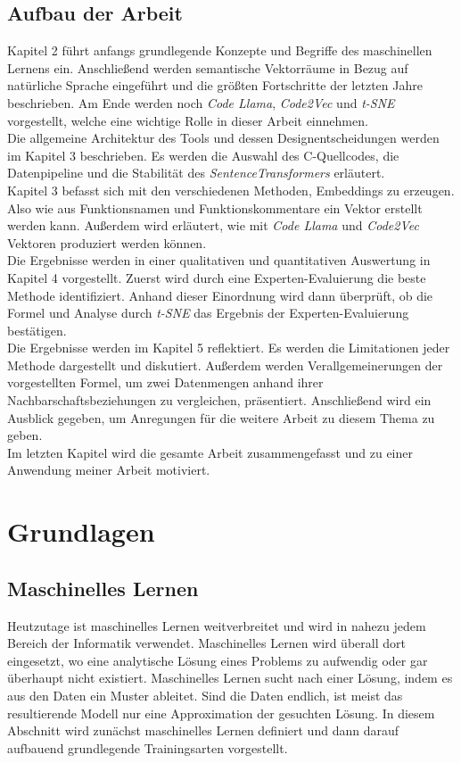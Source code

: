 \documentclass[12pt,letterpaper,ngerman]{article}
\begin{document}
\subsection{Aufbau der Arbeit}
Kapitel 2 führt anfangs grundlegende Konzepte und Begriffe des
maschinellen Lernens ein. Anschließend werden semantische 
Vektorräume in Bezug auf natürliche Sprache eingeführt und die
größten Fortschritte der letzten Jahre 
beschrieben. Am Ende werden noch \textit{Code Llama},  
\textit{Code2Vec} und \textit{t-SNE} vorgestellt, welche eine 
wichtige Rolle in dieser Arbeit einnehmen.\\
Die allgemeine Architektur des Tools und dessen Designentscheidungen werden im Kapitel 3
beschrieben. Es werden die Auswahl des C-Quellcodes, die Datenpipeline und die 
Stabilität des \textit{SentenceTransformers} erläutert.\\
Kapitel 3 befasst sich mit den verschiedenen Methoden, Embeddings
zu erzeugen. Also wie aus Funktionsnamen und Funktionskommentare 
ein Vektor erstellt werden kann. Außerdem wird erläutert, wie mit
\textit{Code Llama} und  \textit{Code2Vec} Vektoren produziert
werden können.\\
Die Ergebnisse werden in einer qualitativen und quantitativen 
Auswertung in Kapitel 4 vorgestellt. Zuerst wird durch eine 
Experten-Evaluierung die beste
Methode identifiziert. Anhand dieser Einordnung wird dann 
überprüft, ob die Formel und Analyse durch \textit{t-SNE} 
das Ergebnis der Experten-Evaluierung bestätigen.\\
Die Ergebnisse werden im Kapitel 5 reflektiert.
Es werden die Limitationen jeder 
Methode dargestellt und diskutiert.
Außerdem werden Verallgemeinerungen der vorgestellten Formel,
um zwei Datenmengen
anhand ihrer Nachbarschaftsbeziehungen zu
vergleichen, präsentiert.
Anschließend wird ein Ausblick gegeben, um Anregungen
für die weitere Arbeit zu diesem Thema zu geben.\\
Im letzten Kapitel wird die gesamte Arbeit zusammengefasst und 
zu einer Anwendung meiner Arbeit motiviert.
\pagebreak
\section{Grundlagen}
\subsection{Maschinelles Lernen}
Heutzutage ist maschinelles Lernen weitverbreitet und wird in nahezu jedem
Bereich der Informatik verwendet.  Maschinelles Lernen wird überall dort 
eingesetzt, wo eine analytische Lösung eines Problems zu aufwendig oder gar 
überhaupt nicht existiert. Maschinelles Lernen sucht nach einer Lösung, indem 
es aus den Daten ein Muster ableitet. Sind die Daten endlich, ist meist das 
resultierende Modell nur eine Approximation der gesuchten Lösung. In diesem 
Abschnitt wird zunächst maschinelles Lernen definiert und dann darauf aufbauend 
grundlegende Trainingsarten vorgestellt.
\end{document}
